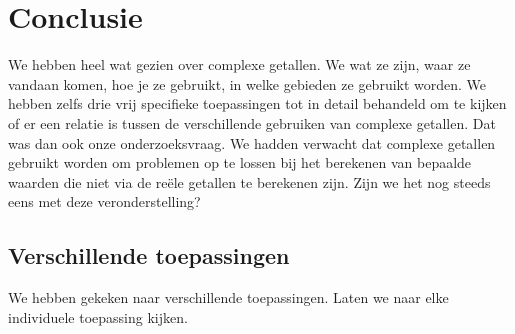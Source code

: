 \documentclass[11pt,fleqn]{book} %
\begin{document}

\chapter{Conclusie}
We hebben heel wat gezien over complexe getallen. We wat ze zijn, waar ze vandaan komen, hoe je ze gebruikt, in welke gebieden ze gebruikt worden. We hebben zelfs drie vrij specifieke toepassingen tot in detail behandeld om te kijken of er een relatie is tussen de verschillende gebruiken van complexe getallen.
Dat was dan ook onze onderzoeksvraag. We hadden verwacht dat complexe getallen gebruikt worden om problemen op te lossen bij het berekenen van bepaalde waarden die niet via de reële getallen te berekenen zijn. Zijn we het nog steeds eens met deze veronderstelling?

\section{Verschillende toepassingen}
We hebben gekeken naar verschillende toepassingen. Laten we naar elke individuele toepassing kijken.
\end{document}
